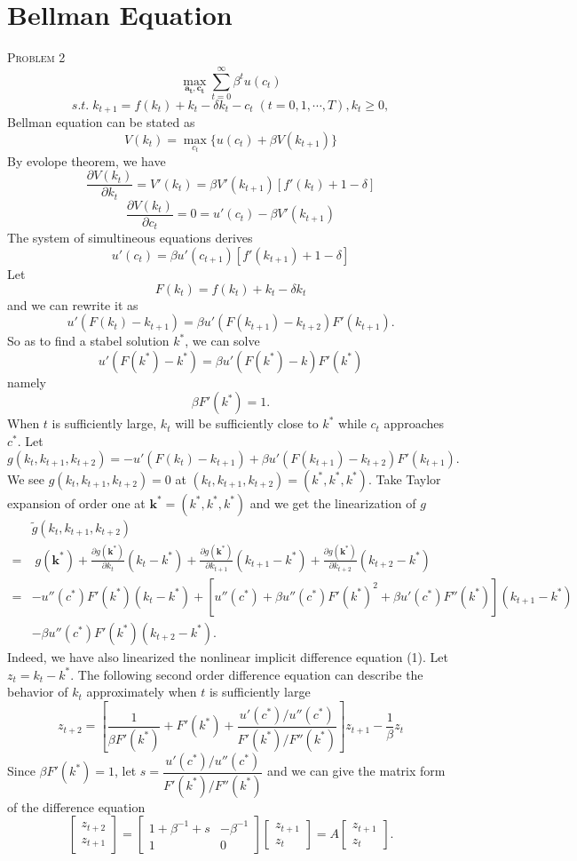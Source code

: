\documentclass{article}
\begin{document}
\section{Bellman Equation}
\textsc{Problem 2}
$$
\max_{\mathbf{a_t},\mathbf{c_t}}\sum_{t=0}^\infty \beta^t u(c_t) 
$$
$$
s.t.\; k_{t+1}=f(k_t)+k_t-\delta k_t-c_t\;(t=0,1,\cdots ,T),k_{t}\ge 0,
$$
Bellman equation can be stated as
$$
V(k_t)=\max_{c_t}\{u(c_t)+\beta V(k_{t+1})\}
$$
By evolope theorem, we have
$$
\frac{\partial V(k_t)}{\partial k_t}=V'(k_t)=\beta V'(k_{t+1})[f'(k_t)+1-\delta]
$$
$$
\frac{\partial V(k_t)}{\partial c_t}=0=u'(c_t)-\beta V'(k_{t+1})
$$
The system of simultineous equations derives 
$$
u'(c_t)=\beta u'(c_{t+1})[f'(k_{t+1})+1-\delta ]
$$
Let $$F(k_t)=f(k_t)+k_t-\delta k_t$$ and we can rewrite it as 
\begin{equation}
	u'(F(k_t)-k_{t+1})=\beta u'(F(k_{t+1})-k_{t+2})F'(k_{t+1}).
\end{equation}
So as to find a stabel solution $k^*$, we can solve
$$
u'(F(k^*)-k^*)=\beta u'(F(k^*)-k)F'(k^*)
$$
namely
$$
\beta F'(k^*)=1.
$$
When $t$ is sufficiently large, $k_t$ will be sufficiently close to $k^*$ while $c_t$ approaches $c^*$. Let
$$
g(k_t,k_{t+1},k_{t+2})=-u'(F(k_t)-k_{t+1})+\beta u'(F(k_{t+1})-k_{t+2})F'(k_{t+1}).
$$
We see $g(k_t,k_{t+1},k_{t+2})=0$ at $(k_t,k_{t+1},k_{t+2})=(k^*,k^*,k^*)$. Take Taylor expansion of order one at $\mathbf{k^*}=(k^*,k^*,k^*)$ and we get the linearization of $g$
\begin{align*}	
&  \widetilde{g}(k_t,k_{t+1},k_{t+2})\\
= &\;g(\mathbf{k^*})+\frac{\partial g(\mathbf{k^*})}{\partial k_t}(k_t-k^*)+\frac{\partial g(\mathbf{k^*})}{\partial k_{t+1}}(k_{t+1}-k^*)+\frac{\partial g(\mathbf{k^*})}{\partial k_{t+2}}(k_{t+2}-k^*)\\
= & -u''(c^*)F'(k^*)(k_t-k^*)+[u''(c^*)+\beta u''(c^*)F'(k^*)^2+\beta u'(c^*)F''(k^*)](k_{t+1}-k^*)\\
& -\beta u''(c^*)F'(k^*)(k_{t+2}-k^*).
\end{align*}
Indeed, we have also linearized the nonlinear implicit difference equation (1). Let $z_t=k_t-k^*$. The following second order difference equation can describe the behavior of $k_t$ approximately when $t$ is sufficiently large
\[
z_{t+2}= \left[\frac{1}{\beta F'(k^*)}+ F'(k^*)+\frac{ u'(c^*)/u''(c^*)}{F'(k^*)/F''(k^*)}\right]z_{t+1}-\frac{1}{\beta}z_t
\]
Since $\beta F'(k^*)=1$, let $s=\dfrac{ u'(c^*)/u''(c^*)}{F'(k^*)/F''(k^*)}$ and we can give the matrix form of the difference equation
$$
\begin{bmatrix}
z_{t+2}\\
z_{t+1}  
\end{bmatrix}
=
\begin{bmatrix}
1+\beta^{-1}+s&-\beta^{-1}\\
1  &0
\end{bmatrix}
\begin{bmatrix}
z_{t+1}\\
z_{t}  
\end{bmatrix}
=A
\begin{bmatrix}
z_{t+1}\\
z_{t}  
\end{bmatrix}.
$$
\end{document}
